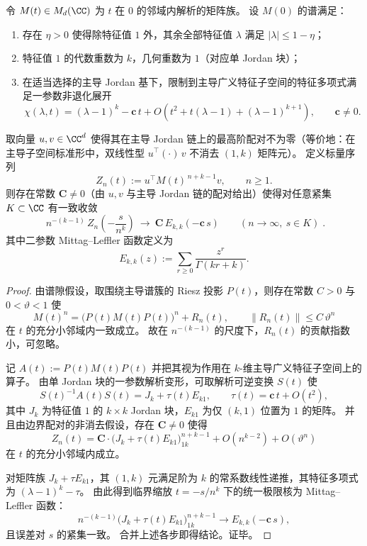 \begin{theorem}\label{thm:xi-mittag-leffler-universal-kfold-jordan-collision}
令 \(M(t)\in M_d(\CC)\) 为 \(t\) 在 \(0\) 的邻域内解析的矩阵族。
设 \(M(0)\) 的谱满足：
\begin{enumerate}
  \item 存在 \(\eta>0\) 使得除特征值 \(1\) 外，其余全部特征值 \(\lambda\) 满足 \(|\lambda|\le 1-\eta\)；
  \item 特征值 \(1\) 的代数重数为 \(k\)，几何重数为 \(1\)（对应单 Jordan 块）；
  \item 在适当选择的主导 Jordan 基下，限制到主导广义特征子空间的特征多项式满足一参数非退化展开
  \[
  \chi(\lambda,t)
  =(\lambda-1)^k-\mathbf c\,t
  +O\!\left(t^2+t(\lambda-1)+(\lambda-1)^{k+1}\right),
  \qquad
  \mathbf c\neq 0.
  \]
\end{enumerate}
取向量 \(u,v\in\CC^d\) 使得其在主导 Jordan 链上的最高阶配对不为零（等价地：在主导子空间标准形中，双线性型 \(u^\top(\cdot)\,v\) 不消去 \((1,k)\) 矩阵元）。
定义标量序列
\[
Z_n(t):=u^\top M(t)^{\,n+k-1}v,\qquad n\ge 1.
\]
则存在常数 \(\mathbf C\neq 0\)（由 \(u,v\) 与主导 Jordan 链的配对给出）使得对任意紧集 \(K\subset\CC\) 有一致收敛
\[
\boxed{\;
n^{-(k-1)}\,Z_n\!\left(-\frac{s}{n^k}\right)\ \longrightarrow\
\mathbf C\,E_{k,k}\!\left(-\mathbf c\,s\right)
\qquad (n\to\infty,\ s\in K)\; }.
\]
其中二参数 Mittag--Leffler 函数定义为
\[
E_{k,k}(z):=\sum_{r\ge 0}\frac{z^r}{\Gamma(kr+k)}.
\]
\end{theorem}
\begin{proof}
由谱隙假设，取围绕主导谱簇的 Riesz 投影 \(P(t)\)，则存在常数 \(C>0\) 与 \(0<\vartheta<1\) 使
\[
M(t)^n=\bigl(P(t)M(t)P(t)\bigr)^n+R_n(t),
\qquad
\|R_n(t)\|\le C\,\vartheta^n
\]
在 \(t\) 的充分小邻域内一致成立。
故在 \(n^{-(k-1)}\) 的尺度下，\(R_n(t)\) 的贡献指数小，可忽略。
\par
记 \(A(t):=P(t)M(t)P(t)\) 并把其视为作用在 \(k\)-维主导广义特征子空间上的算子。
由单 Jordan 块的一参数解析变形，可取解析可逆变换 \(S(t)\) 使
\[
S(t)^{-1}A(t)S(t)=J_k+\tau(t)E_{k1},
\qquad
\tau(t)=\mathbf c\,t+O(t^2),
\]
其中 \(J_k\) 为特征值 \(1\) 的 \(k\times k\) Jordan 块，\(E_{k1}\) 为仅 \((k,1)\) 位置为 \(1\) 的矩阵。
并且由边界配对的非消去假设，存在 \(\mathbf C\neq 0\) 使得
\[
Z_n(t)=\mathbf C\cdot \bigl(J_k+\tau(t)E_{k1}\bigr)^{n+k-1}_{1k}
 +O(n^{k-2})+O(\vartheta^n)
\]
在 \(t\) 的充分小邻域内成立。
\par
对矩阵族 \(J_k+\tau E_{k1}\)，其 \((1,k)\) 元满足阶为 \(k\) 的常系数线性递推，其特征多项式为 \((\lambda-1)^k-\tau\)。
由此得到临界缩放 \(t=-s/n^k\) 下的统一极限核为 Mittag--Leffler 函数：
\[
n^{-(k-1)}\bigl(J_k+\tau(t)E_{k1}\bigr)^{n+k-1}_{1k}
\longrightarrow
E_{k,k}\!\left(-\mathbf c\,s\right),
\]
且误差对 \(s\) 的紧集一致。
合并上述各步即得结论。证毕。
\end{proof}

